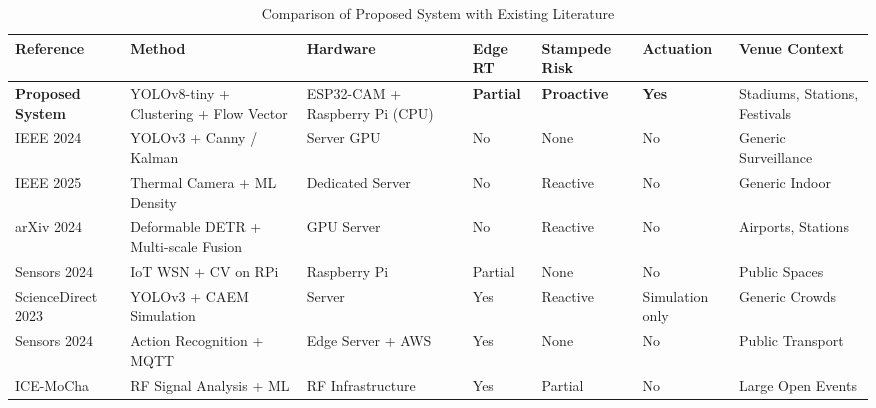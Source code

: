 \documentclass[12pt,a4paper]{article}
\begin{document}
\begin{table}[h!]
\centering
\caption{Comparison of Proposed System with Existing Literature}
\label{tab:comparison}
\renewcommand{\arraystretch}{1.3}
\small
\begin{tabularx}{\textwidth}{|L{2.8cm}|L{2.5cm}|L{2.0cm}|C{1.2cm}|C{1.4cm}|C{1.4cm}|L{2.2cm}|}
\hline
{}
\color{white}\textbf{Reference} &
\color{white}\textbf{Method} &
\color{white}\textbf{Hardware} &
\color{white}\textbf{Edge RT} &
\color{white}\textbf{Stampede Risk} &
\color{white}\textbf{Actuation} &
\color{white}\textbf{Venue Context} \\
\hline

\textbf{Proposed System} &
YOLOv8-tiny + Clustering + Flow Vector &
ESP32-CAM + Raspberry Pi (CPU) &
\textbf{Partial} &
\textbf{Proactive} &
\textbf{Yes} &
Stadiums, Stations, Festivals \\
\hline

IEEE 2024~\cite{ieee_yolo_crowd} &
YOLOv3 + Canny / Kalman &
Server GPU &
No &
None &
No &
Generic Surveillance \\
\hline

IEEE 2025~\cite{ieee_thermal} &
Thermal Camera + ML Density &
Dedicated Server &
No &
Reactive &
No &
Generic Indoor \\
\hline

arXiv 2024~\cite{detr_stampede} &
Deformable DETR + Multi-scale Fusion &
GPU Server &
No &
Reactive &
No &
Airports, Stations \\
\hline

Sensors 2024~\cite{iot_middleware} &
IoT WSN + CV on RPi &
Raspberry Pi &
Partial &
None &
No &
Public Spaces \\
\hline

ScienceDirect 2023~\cite{caem_2023} &
YOLOv3 + CAEM Simulation &
Server &
Yes &
Reactive &
Simulation only &
Generic Crowds \\
\hline

Sensors 2024~\cite{barthelemy_2024} &
Action Recognition + MQTT &
Edge Server + AWS &
Yes &
None &
No &
Public Transport \\
\hline

ICE-MoCha~\cite{icemocha} &
RF Signal Analysis + ML &
RF Infrastructure &
Yes &
Partial &
No &
Large Open Events \\
\hline

\end{tabularx}
\end{table}
\end{document}
